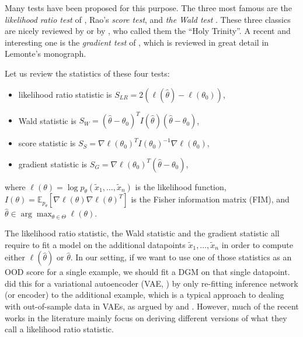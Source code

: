 {Many tests have been proposed for this purpose. The three most famous are the \emph{likelihood ratio test} of \textcite{neyman_use_1928}, Rao's \citeyearpar{rao_large_1948} \emph{score test},
and \emph{the Wald test} \parencite{wald_tests_1943}. These three classics are nicely reviewed by \textcite{buse_likelihood_1982} or by \textcite{rao_score_2005}, who called them the ``Holy Trinity''. A recent and interesting one is the \emph{gradient test} of \textcite{terrell_gradient_2002}, which is reviewed in great detail in Lemonte's \citeyearpar{lemonte_gradient_2016} monograph.

Let us review the statistics of these four tests:
\begin{itemize}
    \item likelihood ratio statistic is $S_{LR} = 2 ( \ell ( \hat{\theta}) -\ell ( \theta_0))$,
    \item Wald statistic is $S_{W} = (\hat{\theta} - \theta_0)^T I(\hat{\theta}) (\hat{\theta} - \theta_0)$,
    \item score statistic is $S_{S} = \nabla \ell ( \theta_0)^T I(\theta_0)^{-1}  \nabla \ell ( \theta_0)$,
    \item gradient statistic is $S_{G} = \nabla \ell ( \theta_0)^T (\hat{\theta} - \theta_0)$,
\end{itemize}
where $ \ell ( \theta) = \log p_\theta (\tilde{x}_1,\ldots,\tilde{x}_n)$ is the likelihood function, 
$I({\theta}) = \mathbb{E}_{p_\theta}[\nabla \ell ( \theta)\nabla \ell ( \theta)^T]$ is the Fisher information matrix (FIM), and $ \hat{\theta} \in \arg\max_{\theta \in \Theta} \ell ( \theta)$.

The likelihood ratio statistic, the Wald statistic and the gradient statistic all require to fit a model on the additional datapoints $\tilde{x}_1,\ldots,\tilde{x}_n$ in order to compute either $\ell(\hat{\theta})$ or $\hat{\theta}$. 
%
In our setting, if we want to use one of those statistics as an OOD score for a single example, we should fit a DGM on that single datapoint. \textcite{xiao_likelihood_2020} did this for a variational autoencoder (VAE, \citealp{kingma_autoencoding_2014,rezende_stochastic_2014}) by only re-fitting inference network (or encoder) to the additional example, which is a typical approach to dealing with out-of-sample data in VAEs, as argued by \textcite{cremer_inference_2018} and \textcite{mattei_refit_2018}.
However, much of the recent works in the literature \parencite{ren_likelihood_2019, schirrmeister_understanding_2020, serra_input_2020} mainly focus on deriving different versions of what they call a likelihood ratio statistic.

}
